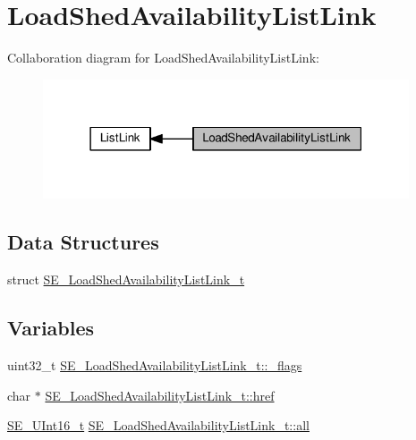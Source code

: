 \hypertarget{group__LoadShedAvailabilityListLink}{}\section{Load\+Shed\+Availability\+List\+Link}
\label{group__LoadShedAvailabilityListLink}
Collaboration diagram for Load\+Shed\+Availability\+List\+Link\+:\nopagebreak
\begin{figure}[H]
\begin{center}
\leavevmode
\includegraphics[width=307pt]{group__LoadShedAvailabilityListLink}
\end{center}
\end{figure}
\subsection*{Data Structures}
\begin{DoxyCompactItemize}
\item 
struct \hyperlink{structSE__LoadShedAvailabilityListLink__t}{S\+E\+\_\+\+Load\+Shed\+Availability\+List\+Link\+\_\+t}
\end{DoxyCompactItemize}
\subsection*{Variables}
\begin{DoxyCompactItemize}
\item 
uint32\+\_\+t \hyperlink{group__LoadShedAvailabilityListLink_ga15ccf58f6147475c85154f31d26113f7}{S\+E\+\_\+\+Load\+Shed\+Availability\+List\+Link\+\_\+t\+::\+\_\+flags}
\item 
char $\ast$ \hyperlink{group__LoadShedAvailabilityListLink_gae2e84f55b64ef90ea74bcddce389f77a}{S\+E\+\_\+\+Load\+Shed\+Availability\+List\+Link\+\_\+t\+::href}
\item 
\hyperlink{group__UInt16_gac68d541f189538bfd30cfaa712d20d29}{S\+E\+\_\+\+U\+Int16\+\_\+t} \hyperlink{group__LoadShedAvailabilityListLink_gad05e8fa55aae27cf8d5534318a6612c5}{S\+E\+\_\+\+Load\+Shed\+Availability\+List\+Link\+\_\+t\+::all}
\end{DoxyCompactItemize}


